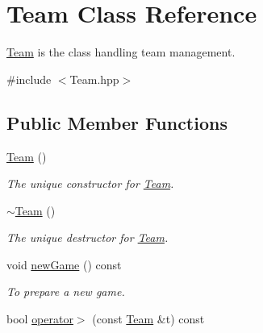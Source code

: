 \hypertarget{classTeam}{\section{\-Team \-Class \-Reference}
\label{classTeam}
}


\hyperlink{classTeam}{\-Team} is the class handling team management.  




{\ttfamily \#include $<$\-Team.\-hpp$>$}

\subsection*{\-Public \-Member \-Functions}
\begin{DoxyCompactItemize}
\item 
\hypertarget{classTeam_aada295895b747960576b69d8c87a54ba}{\hyperlink{classTeam_aada295895b747960576b69d8c87a54ba}{\-Team} ()}\label{classTeam_aada295895b747960576b69d8c87a54ba}

\begin{DoxyCompactList}\small\item\em \-The unique constructor for \hyperlink{classTeam}{\-Team}. \end{DoxyCompactList}\item 
\hypertarget{classTeam_ab4218fddd612d52bab47bec4feeb49de}{\hyperlink{classTeam_ab4218fddd612d52bab47bec4feeb49de}{$\sim$\-Team} ()}\label{classTeam_ab4218fddd612d52bab47bec4feeb49de}

\begin{DoxyCompactList}\small\item\em \-The unique destructor for \hyperlink{classTeam}{\-Team}. \end{DoxyCompactList}\item 
\hypertarget{classTeam_ad03ad0d41d61403a6f06e6742aca72d3}{void \hyperlink{classTeam_ad03ad0d41d61403a6f06e6742aca72d3}{new\-Game} () const }\label{classTeam_ad03ad0d41d61403a6f06e6742aca72d3}

\begin{DoxyCompactList}\small\item\em \-To prepare a new game. \end{DoxyCompactList}\item 
\hypertarget{classTeam_a3164302f1fd5d70db2e85994488f8054}{bool \hyperlink{classTeam_a3164302f1fd5d70db2e85994488f8054}{operator$>$} (const \hyperlink{classTeam}{\-Team} \&t) const }\label{classTeam_a3164302f1fd5d70db2e85994488f8054}


\end{DoxyCompactItemize}

